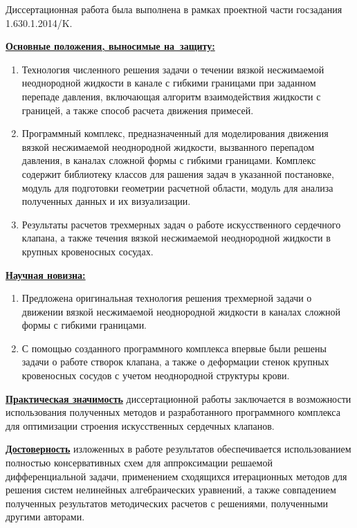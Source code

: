 Диссертационная работа была выполнена в рамках проектной части госзадания 1.630.1.2014/K.

\underline{\textbf{Основные положения, выносимые на~защиту:}}
\begin{enumerate}
 \item Технология численного решения задачи о течении вязкой несжимаемой неоднородной жидкости
     в канале с гибкими границами при заданном перепаде давления, включающая алгоритм взаимодействия
     жидкости с границей, а также способ расчета движения примесей.
 \item Программный комплекс, предназначенный для моделирования движения вязкой несжимаемой неоднородной
     жидкости, вызванного перепадом давления, в каналах сложной формы с гибкими границами. Комплекс содержит
     библиотеку классов для рашения задач в указанной постановке, модуль для подготовки геометрии расчетной области,
     модуль для анализа полученных данных и их визуализации.
 \item Результаты расчетов трехмерных задач о работе искусственного сердечного клапана, а также течения вязкой несжимаемой
     неоднородной жидкости в крупных кровеносных сосудах.
\end{enumerate}

\underline{\textbf{Научная новизна:}}
\begin{enumerate}
 \item Предложена оригинальная технология решения трехмерной задачи о движении вязкой несжимаемой неоднородной
     жидкости в каналах сложной формы с гибкими границами.
 \item С помощью созданного программного комплекса впервые были решены задачи о работе створок клапана, а также о деформации
     стенок крупных кровеносных сосудов с учетом неоднородной структуры крови.
\end{enumerate}

\underline{\textbf{Практическая значимость}} диссертационной работы заключается в возможности использования полученных методов
и разработанного программного комплекса для оптимизации строения искусственных сердечных клапанов.

\underline{\textbf{Достоверность}} изложенных в работе результатов обеспечивается использованием полностью консервативных схем для аппроксимации
решаемой дифференциальной задачи, применением сходящихся итерационных методов для решения систем нелинейных алгебраических уравнений, а также
совпадением полученных результатов методических расчетов с решениями, полученными другими авторами.

